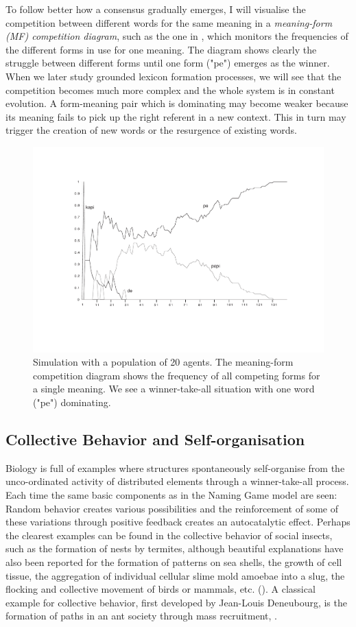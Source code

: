 To follow better how a consensus gradually emerges, I will visualise
the competition between different words for the same meaning
in a {\it meaning-form (MF) competition diagram}, 
such as the one in , which monitors 
the frequencies of the different forms in use for one meaning.
The diagram shows clearly the struggle between different forms until
one form ("pe") emerges as the winner. When we later study 
grounded lexicon formation processes, we will see that the 
competition becomes much more complex and the whole system 
is in constant evolution. A form-meaning pair which is 
dominating may become weaker because its meaning
fails to pick up the right
referent in a new context. 
This in turn may trigger the creation of new words or the 
resurgence of existing words. 
\begin{figure}[htbp]
  \centerline{\includegraphics[width=.70\textwidth]{chap5/figs/comp1}}
\caption{\label{competition} Simulation with 
a population of 20 agents. The meaning-form competition 
diagram shows the frequency of all competing forms for a 
single meaning. We see a winner-take-all situation
with one word ("pe") dominating.}
\end{figure}

\subsection{Collective Behavior and Self-organisation}

Biology is full of examples where structures spontaneously 
self-organise from the unco-ordinated activity 
of distributed elements through a winner-take-all process.
Each time the same basic components as in the Naming Game model
are seen: Random behavior creates various possibilities and the 
reinforcement of some of these variations through positive
feedback creates an autocatalytic effect. 
Perhaps the clearest examples can be found 
in the collective behavior of 
social insects, such as the formation of nests by termites, 
although beautiful explanations have also been reported
for the formation of patterns on sea shells, the growth of
cell tissue, the aggregation
of individual cellular slime mold amoebae into a slug, 
the flocking and collective movement of birds or mammals, 
etc. (\cite{Meinhardt:1982}). A classical 
example for collective behavior, first developed by Jean-Louis 
Deneubourg, is the formation of paths in an ant society through 
mass recruitment, \cite{Pasteels:1987}. 


